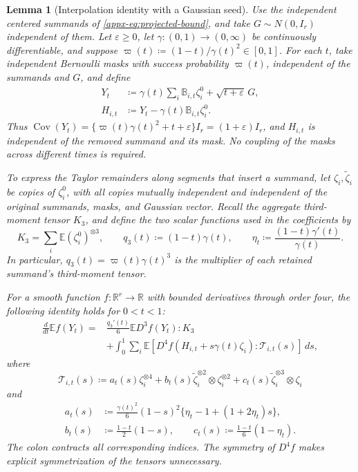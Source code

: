\documentclass[11pt,letterpaper,twoside,leqno]{article}
\theoremstyle{bookplain}
\newtheorem{lemma}{Lemma}
\theoremstyle{bookremark}
\newcommand{\E}{\mathbb E}
\newcommand{\R}{\mathbb R}
\newcommand{\Cov}{\operatorname{Cov}}
\newcommand{\dd}{\,d}
\begin{document}
\begin{lemma}[Interpolation identity with a Gaussian seed]
\label{appx-an:lem:identity}
Use the independent centered summands of
\eqref{appx-eq:projected-bound}, and take \(G\sim N(0,I_r)\)
independent of them. Let \(\varepsilon\ge0\), let
\(\gamma:(0,1)\to(0,\infty)\) be continuously differentiable, and
suppose
\(\varpi(t)\coloneqq(1-t)/\gamma(t)^2\in[0,1]\).
For each \(t\), take independent Bernoulli masks with success
probability \(\varpi(t)\), independent of the summands and \(G\),
and define
\begin{equation}
 \begin{aligned}
 Y_t&\coloneqq\gamma(t)\sum_i\mathbb B_{i,t}\zeta_i^0
                    +\sqrt{t+\varepsilon}\,G,\\
 H_{i,t}&\coloneqq Y_t-\gamma(t)\mathbb B_{i,t}\zeta_i^0.
 \end{aligned}
 \label{eq:interpolation-family}
\end{equation}
Thus \(\Cov(Y_t)=\{\varpi(t)\gamma(t)^2+t+\varepsilon\}I_r
=(1+\varepsilon)I_r\), and \(H_{i,t}\) is independent of the
removed summand and its mask. No coupling of the masks across
different times is required.

To express the Taylor remainders along segments that insert a
summand, let \(\zeta_i,\widetilde\zeta_i\) be copies of
\(\zeta_i^0\), with all copies mutually independent and independent
of the original summands, masks, and Gaussian vector. Recall the
aggregate third-moment tensor \(K_3\), and define the two scalar
functions used in the coefficients by
\[
 K_3=\sum_i\E(\zeta_i^0)^{\otimes3},\qquad
 q_3(t)\coloneqq(1-t)\gamma(t),\qquad
 \eta_t\coloneqq\frac{(1-t)\gamma'(t)}{\gamma(t)}.
\]
In particular, \(q_3(t)=\varpi(t)\gamma(t)^3\) is the multiplier
of each retained summand's third-moment tensor.

For a smooth function \(f:\R^r\to\R\) with bounded derivatives
through order four, the following identity holds for \(0<t<1\):
\begin{equation}
 \begin{aligned}
 \frac{d}{dt}\E f(Y_t)
 ={}&\frac{q_3'(t)}6\E D^3f(Y_t):K_3\\
 &+\int_0^1\sum_i\E\!\left[
       D^4f(H_{i,t}+s\gamma(t)\zeta_i):\mathcal T_{i,t}(s)
     \right]\dd s,
 \end{aligned}
 \label{appx-an:fourth-identity}
\end{equation}
where
\[
 \mathcal T_{i,t}(s)\coloneqq
 a_t(s)\zeta_i^{\otimes4}
 +b_t(s)\widetilde\zeta_i^{\otimes2}\otimes\zeta_i^{\otimes2}
 +c_t(s)\widetilde\zeta_i^{\otimes3}\otimes\zeta_i
\]
and
\begin{equation}
 \begin{aligned}
 a_t(s)&\coloneqq\frac{\gamma(t)^2}{6}(1-s)^2
                   \{\eta_t-1+(1+2\eta_t)s\},\\
 b_t(s)&\coloneqq\frac{1-t}{2}(1-s),\qquad
 c_t(s)\coloneqq\frac{1-t}{6}(1-\eta_t).
 \end{aligned}
 \label{appx-an:kernel}
\end{equation}
The colon contracts all corresponding indices. The symmetry of
\(D^4f\) makes explicit symmetrization of the tensors unnecessary.
\end{lemma}
\end{document}
